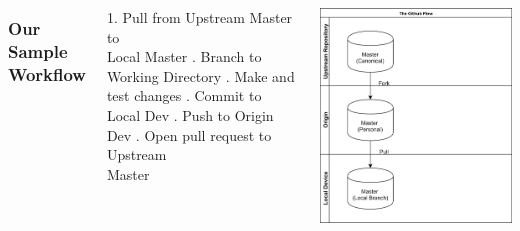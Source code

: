 \documentclass[unknownkeysallowed]{beamer}
\begin{document}
\begin{frame}
    \vspace{1cm}
	\begin{columns}
		\column{2.5in}
    \frametitle{Our Sample Workflow}
        1. Pull from Upstream Master to \\
        Local Master \linebreak{}. Branch to Working Directory \linebreak{}. Make and test changes \linebreak{}. Commit to Local Dev \linebreak{}. Push to Origin Dev \linebreak{}. Open pull request to Upstream \\
        Master
	\column{2.25in}
	\begin{center}
	\includegraphics[width = .9\linewidth]{assets/gitflow3}
	\end{center}
	\end{columns}
    \vspace{1cm}
\end{frame}
\end{document}

